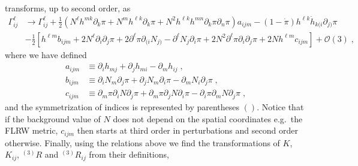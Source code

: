 \documentclass[a4paper,11pt]{article}
\numberwithin{equation}{section}
\begin{document}
transforms, up to second order, as
\begin{align}
\Gamma_{ij}^\ell &\rightarrow \Gamma_{ij}^\ell + \frac{1}{2} (N^\ell h^{mk} \partial_k \pi + N^m h^{\ell k} \partial_k \pi + N^2 h^{\ell k} h^{m n} \partial_k \pi \partial_n \pi) a_{ijm} - (1 - \dot{\pi}) h^{\ell k} \dot{h}_{k(i} \partial_{j)} \pi \nonumber \\ &- \frac{1}{2} [h^{\ell m} b_{ijm} + 2 N^\ell \partial_i \partial_j \pi + 2 \partial^\ell \pi \partial_{(i} N_{j)} - \partial^\ell N_j \partial_i \pi + 2 N^2 \partial^\ell \pi \partial_i \partial_j \pi + 2N h^{\ell m} c_{ijm}] + \mathcal{O}(3)\;, 
\end{align}
where we have defined 
\begin{align}
a_{ijm} &\equiv \partial_i h_{mj} + \partial_j h_{mi} - \partial_m h_{ij} \;, \\
b_{ijm} &\equiv \partial_i N_m \partial_j \pi + \partial_j N_m \partial_i \pi - \partial_m N_i \partial_j \pi \;, \\
c_{ijm} &\equiv \partial_m\pi \partial_i N \partial_j \pi  + \partial_m\pi \partial_j N \partial_i \pi - \partial_i\pi \partial_m N \partial_j \pi \;,
\end{align}
and the symmetrization of indices is represented by parentheses $()$. Notice that if the background value of $N$ does not depend on the spatial coordinates e.g.~the FLRW metric, $c_{ijm}$ then starts at third order in perturbations and second order otherwise. Finally, using the relations above we find the transformations of $K$, $K_{ij}$, ${}^{(3)}\!R$ and ${}^{(3)}\!R_{ij}$ from their definitions, 
\end{document}
